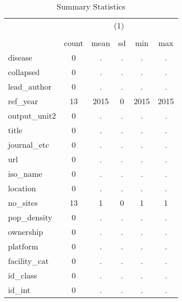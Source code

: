 \begin{table}[htbp]\centering
\def\sym#1{\ifmmode^{#1}\else\(^{#1}\)\fi}
\caption{Summary Statistics}
\begin{tabular}{l*{1}{ccccc}}
\hline\hline
            &\multicolumn{5}{c}{(1)}                                         \\
            &\multicolumn{5}{c}{}                                            \\
            &       count&        mean&          sd&         min&         max\\
\hline
disease     &           0&           .&           .&           .&           .\\
collapsed   &           0&           .&           .&           .&           .\\
lead\_author &           0&           .&           .&           .&           .\\
ref\_year    &          13&        2015&           0&        2015&        2015\\
output\_unit2&           0&           .&           .&           .&           .\\
title       &           0&           .&           .&           .&           .\\
journal\_etc &           0&           .&           .&           .&           .\\
url         &           0&           .&           .&           .&           .\\
iso\_name    &           0&           .&           .&           .&           .\\
location    &           0&           .&           .&           .&           .\\
no\_sites    &          13&           1&           0&           1&           1\\
pop\_density &           0&           .&           .&           .&           .\\
ownership   &           0&           .&           .&           .&           .\\
platform    &           0&           .&           .&           .&           .\\
facility\_cat&           0&           .&           .&           .&           .\\
id\_class    &           0&           .&           .&           .&           .\\
id\_int      &           0&           .&           .&           .&           .\\

\end{tabular}
\end{table}
